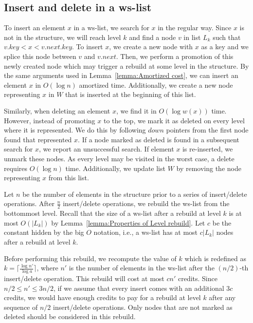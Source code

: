 \documentclass[11pt]{article}       %
\newcommand{\wlist}{ws-list\xspace}
\begin{document}
\subsection{Insert and delete in a \wlist}
To insert an element $x$ in a \wlist, we search for $x$ in the regular way. Since $x$ is not in the structure, we will reach level $k$ and find a node $v$ in list $L_k$ such that $v.key < x< v.next.key$. To insert $x$, we create a new node with $x$ as a key and we splice this node between $v$ and $v.next$. Then, we perform a promotion of this newly created node which may trigger a rebuild at some level in the structure. By the same arguments used in Lemma~\ref{lemma:Amortized cost}, we can insert an element $x$ in $O(\log n)$ amortized time. Additionally, we create a new node representing $x$ in $W$ that is inserted at the beginning of this list.

Similarly, when deleting an element $x$, we find it in $O(\log w(x))$ time. However, instead of promoting $x$ to the top, we mark it as deleted on every level where it is represented. We do this by following $down$ pointers from the first node found that represented $x$. If a node marked as deleted is found in a subsequent search for $x$, we report an unsuccessful search. If element $x$ is re-inserted, we unmark these nodes.
As every level may be visited in the worst case, a delete requires $O(\log n)$ time. 
Additionally, we update list $W$ by removing the node representing $x$ from this list.

Let $n$ be the number of elements in the structure prior to a series of insert/delete operations.
After $\frac{n}{2}$ insert/delete operations, we rebuild the \wlist from the bottommost level. 
Recall that the size of a \wlist after a rebuild at level $k$ is at most $O(|L_k|)$ by Lemma~\ref{lemma:Properties of Level rebuild}. Let $c$ be the constant hidden by the big $O$ notation, i.e., a \wlist has at most $c|L_k|$ nodes after a rebuild at level $k$.

Before performing this rebuild, we recompute the value of $k$ which is redefined as $k = \lceil \frac{\log n'}{\log a}\rceil$, where $n'$ is the number of elements in the \wlist after the $(n/2)$-th insert/delete operation.
This rebuild will cost at most $cn'$ credits.
Since $n/2\leq n' \leq 3n/2$, if we assume that every insert comes with an additional $3c$ credits, 
we would have enough credits to pay for a rebuild at level $k$ after any sequence of $n/2$ insert/delete operations.
Only nodes that are not marked as deleted should be considered in this rebuild.
\end{document}
